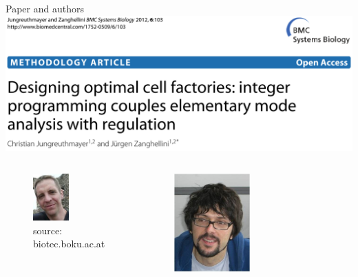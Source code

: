 \documentclass{beamer}
\begin{document}
\begin{frame}{Paper and authors}
    \includegraphics[width=1\textwidth]{grafik/paper}
    \begin{columns}
      \begin{center}
        \begin{figure}
         \includegraphics[width=0.5\textwidth]{grafik/jungreuthmayer} \\
         \tiny{source: biotec.boku.ac.at}
        \end{figure}
      \end{center}
      \begin{center}
        \begin{figure}
         \includegraphics[width=0.5\textwidth]{grafik/zanghellini} \\

\end{figure}
\end{center}
\end{columns}
\end{frame}
\end{document}
